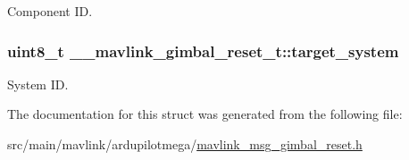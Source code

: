 Component I\+D. 

\hypertarget{struct____mavlink__gimbal__reset__t_adc46a83a37bce9a0b8f42d9938b5f61a}{
\subsubsection[{target\+\_\+system}]{\setlength{\rightskip}{0pt plus 5cm}uint8\+\_\+t \+\_\+\+\_\+mavlink\+\_\+gimbal\+\_\+reset\+\_\+t\+::target\+\_\+system}}\label{struct____mavlink__gimbal__reset__t_adc46a83a37bce9a0b8f42d9938b5f61a}


System I\+D. 



The documentation for this struct was generated from the following file\+:\begin{DoxyCompactItemize}
\item 
src/main/mavlink/ardupilotmega/\hyperlink{mavlink__msg__gimbal__reset_8h}{mavlink\+\_\+msg\+\_\+gimbal\+\_\+reset.\+h}\end{DoxyCompactItemize}
